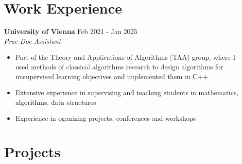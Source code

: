 \documentclass[a4paper, 10pt]{article}
\newcommand{\bulletSpace}{\vspace{-4pt}}
\newcommand{\secStartSpace}{\vspace{3pt}}
\newcommand{\secEndSpace}{\vspace{5pt}}
\newcommand{\workHeader}[3]{
\noindent \large{\textbf{\textcolor{text-color}{#1}}} \hfill \normalsize{#3}\vspace{2pt}\\
	\textit{#2}\vspace{-2pt}
}
\newcommand{\workSubHeader}[2]{
    \noindent \textit{#1} \hfill \normalsize{#2}
	\vspace{-2pt}
}
\newcommand{\boldlarger}[1]{{\large\textbf{\color{secondary}{#1}}}}
\newcommand{\justlarge}[1]{{\large \textbf{#1}}}
\begin{document}
\section{\color{highlight} \textbf{Work Experience}}
\secStartSpace
\begin{addmargin}[0.5em]{1em}
	\workHeader{University of Vienna}{Prae-Doc Assistant}{Feb 2021 - Jan 2025}
	\begin{itemize}
		\item Part of the Theory and Applications of Algorithms (TAA) group, where I used methods of classical algorithms research to design algorithms for unsupervised learning objectives and implemented them in C++
		\item Extensive experience in supervising and teaching students in mathematics, algorithms, data structures %
		\item Experience in oganizing projects, conferences and workshops
	\end{itemize}
\end{addmargin}
\secEndSpace



\section{\color{highlight} \textbf{Projects}}
\secStartSpace
\end{document}
